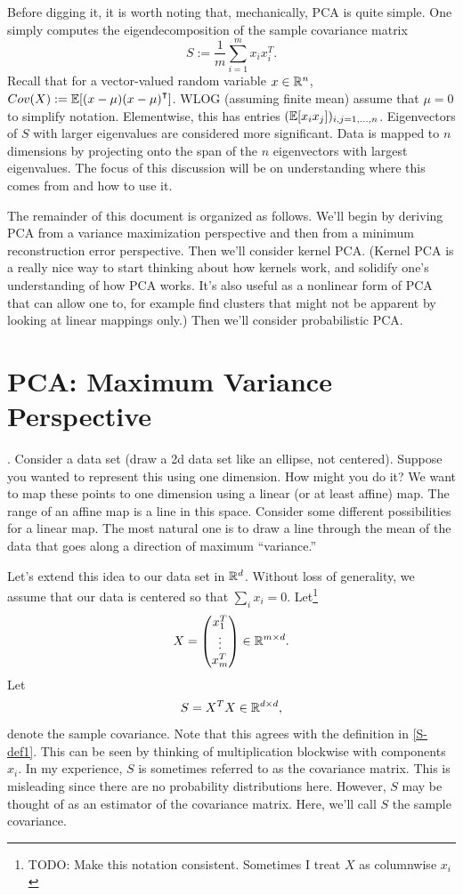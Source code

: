 Before digging it, it is worth noting that, mechanically, PCA is quite simple. One simply computes the eigendecomposition of the sample covariance matrix 
\begin{equation} \label{S-def1}
S := \frac{1}{m}\sum_{i=1}^m x_ix_i^T.
\end{equation}
Recall that for a vector-valued random variable $x\in \mathbb{R}^n$, $Cov(X) := \E[(x- \mu)(x-\mu)^\T]$. WLOG (assuming finite mean) assume that $\mu=0$ to simplify notation. Elementwise, this has entries $(\mathbb{E}[x_ix_j])_{i,j=1,\ldots,n}$. 
Eigenvectors of $S$ with larger eigenvalues are considered more significant. Data is mapped to $n$ dimensions by projecting onto the span of the $n$ eigenvectors with largest eigenvalues. The focus of this discussion will be on understanding where this comes from and how to use it. 

The remainder of this document is organized as follows. We'll begin by deriving PCA from a variance maximization perspective and then from a minimum reconstruction error perspective. Then we'll consider kernel PCA. (Kernel PCA is a really nice way to start thinking about how kernels work, and solidify one's understanding of how PCA works. It's also useful as a nonlinear form of PCA that can allow one to, for example find clusters that might not be apparent by looking at linear mappings only.) Then we'll consider probabilistic PCA. 

\section{PCA: Maximum Variance Perspective}. 
Consider a data set (draw a 2d data set like an ellipse, not centered). Suppose you wanted to represent this using one dimension. How might you do it? We want to map these points to one dimension using a linear (or at least affine) map. The range of an affine map is a line in this space. Consider some different possibilities for a linear map. The most natural one is to draw a line through the mean of the data that goes along a direction of maximum ``variance.'' 

Let's extend this idea to our data set in $\mathbb{R}^d$. Without loss of generality, we assume that our data is centered so that $\sum_i x_i = 0$. Let\footnote{TODO: Make this notation consistent. Sometimes I treat $X$ as columnwise $x_i$}
$$
X = 
\begin{pmatrix}
 x_1^T\\
 \vdots\\
 x_m^T
\end{pmatrix}
\in \mathbb{R}^{m\times d}. 
$$
Let 
$$
S = X^T X \in \mathbb{R}^{d\times d},
$$
denote the sample covariance. Note that this agrees with the definition in \eqref{S-def1}. This can be seen by thinking of multiplication blockwise with components $x_i$. In my experience, $S$ is sometimes referred to as the covariance matrix. This is misleading since there are no probability distributions here. However, $S$ may be thought of as an estimator of the covariance matrix. Here, we'll call $S$ the sample covariance. 

